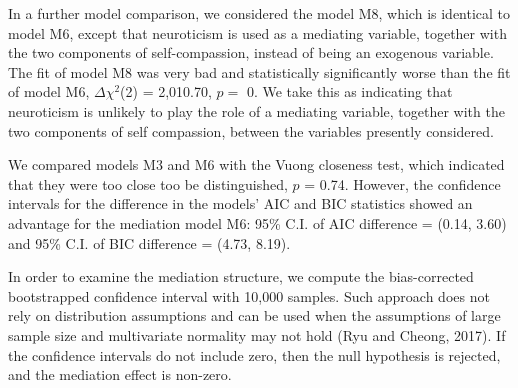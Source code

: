 \documentclass[
  english,
  man,floatsintext]{apa7}
\begin{document}
In a further model comparison, we considered the model M8, which is identical to model M6, except that neuroticism is used as a mediating variable, together with the two components of self-compassion, instead of being an exogenous variable.
The fit of model M8 was very bad and statistically significantly worse than the fit of model M6, \(\Delta \chi^2\)(2) = 2,010.70, \(p =\) 0.
We take this as indicating that neuroticism is unlikely to play the role of a mediating variable, together with the two components of self compassion, between the variables presently considered.

We compared models M3 and M6 with the Vuong closeness test, which indicated that they were too close too be distinguished, \(p\) = 0.74.
However, the confidence intervals for the difference in the models' AIC and BIC statistics showed an advantage for the mediation model M6: 95\% C.I.
of AIC difference = (0.14, 3.60) and 95\% C.I.
of BIC difference = (4.73, 8.19).

In order to examine the mediation structure, we compute the bias-corrected bootstrapped confidence interval with 10,000 samples.
Such approach does not rely on distribution assumptions and can be used when the assumptions of large sample size and multivariate normality may not hold (Ryu and Cheong, 2017).
If the confidence intervals do not include zero, then the null hypothesis is rejected, and the mediation effect is non-zero.
\end{document}
